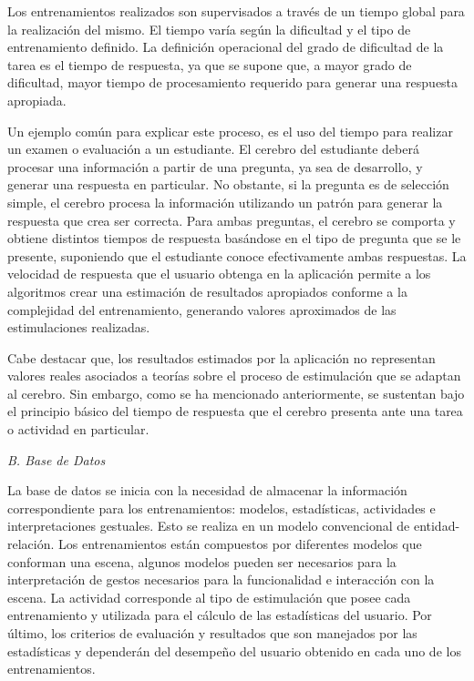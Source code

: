 \documentclass[conference]{IEEEtran}
\begin{document}
Los entrenamientos realizados son supervisados a través de un tiempo global para la realización del mismo. El tiempo varía según la dificultad y el tipo de entrenamiento definido. La definición operacional del grado de dificultad de la tarea es el tiempo de respuesta, ya que se supone que, a mayor grado de dificultad, mayor tiempo de procesamiento requerido para generar una respuesta apropiada.

Un ejemplo común para explicar este proceso, es el uso del tiempo para realizar un examen o evaluación a un estudiante. El cerebro del estudiante deberá procesar una información a partir de una pregunta, ya sea de desarrollo, y generar una respuesta en particular. No obstante, si la pregunta es de selección simple, el cerebro procesa la información utilizando un patrón para generar la respuesta que crea ser correcta. Para ambas preguntas, el cerebro se comporta y obtiene distintos tiempos de respuesta basándose en el tipo de pregunta que se le presente, suponiendo que el estudiante conoce efectivamente ambas respuestas. La velocidad de respuesta que el usuario obtenga en la aplicación permite a los algoritmos crear una estimación de resultados apropiados conforme a la complejidad del entrenamiento, generando valores aproximados de las estimulaciones realizadas.

Cabe destacar que, los resultados estimados por la aplicación no representan valores reales asociados a teorías sobre el proceso de estimulación que se adaptan al cerebro. Sin embargo, como se ha mencionado anteriormente, se sustentan bajo el principio básico del tiempo de respuesta que el cerebro presenta ante una tarea o actividad en particular.
\bigskip

\textit{B. Base de Datos}
\medskip

La base de datos se inicia con la necesidad de almacenar la información correspondiente para los entrenamientos: modelos, estadísticas, actividades e interpretaciones gestuales. Esto se realiza en un modelo convencional de entidad-relación.  Los entrenamientos están compuestos por diferentes modelos que conforman una escena, algunos modelos pueden ser necesarios para la interpretación de gestos necesarios para la funcionalidad e interacción con la escena. La actividad corresponde al tipo de estimulación que posee cada entrenamiento y utilizada para el cálculo de las estadísticas del usuario. Por último, los criterios de evaluación y resultados que son manejados por las estadísticas y dependerán del desempeño del usuario obtenido en cada uno de los entrenamientos.
\end{document}
